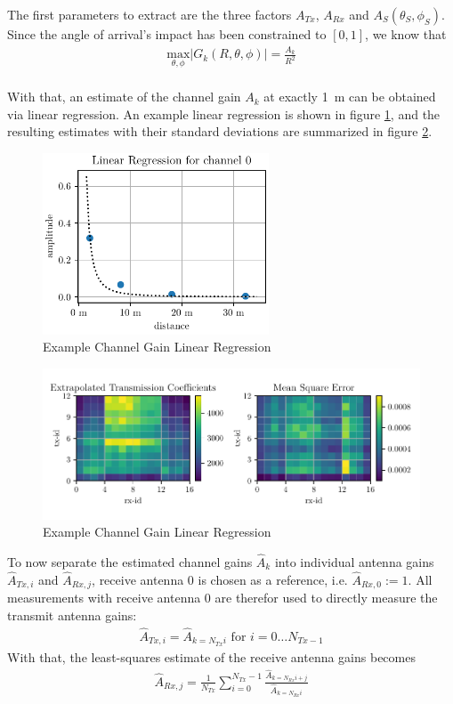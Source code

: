 The first parameters to extract are the three factors $A_{Tx}$, $A_{Rx}$ and $A_S(\theta_S,\phi_S)$.
Since the angle of arrival's impact has been constrained to $[0,1]$, we know that
\begin{align}
    \underset{\theta,\phi}{\text{max}} |G_k(R,\theta,\phi)|  = \frac{A_k}{R^2} \label{eqn:max_G}
\end{align} \\
With that, an estimate of the channel gain $A_k$ at exactly \SI{1}{\meter} can be obtained via linear regression.
An example linear regression is shown in figure \ref{fig:ch0_amp_linreg},
and the resulting estimates with their standard deviations are summarized in figure \ref{fig:amp_linreg}. \\

\begin{figure}
    \centering
    \includegraphics[width=0.6\textwidth]{../figures/ch0_amplitude_linreg.pdf}
    \caption{Example Channel Gain Linear Regression}
    \label{fig:ch0_amp_linreg}
\end{figure}
\begin{figure}
    \centering
    \includegraphics[width=\textwidth]{../figures/amplitude_linreg.pdf}
    \caption{Example Channel Gain Linear Regression}
    \label{fig:amp_linreg}
\end{figure}
To now separate the estimated channel gains $\hat A_k$ into individual antenna gains $\hat A_{Tx,i}$ and $\hat A_{Rx,j}$,
receive antenna 0 is chosen as a reference, i.e. $\hat A_{Rx,0} :=1$.
All measurements with receive antenna 0 are therefor used to directly measure the transmit antenna gains:
\begin{align}
    \hat A_{Tx,i}  = \hat A_{k=N_{Tx}i} \text{ for }i=0 \dots N_{Tx-1}
\end{align}
With that, the least-squares estimate of the receive antenna gains becomes
\begin{align}
    \hat A_{Rx,j} = \frac{1}{N_{Tx}} \sum_{i=0}^{N_{Tx}-1} \frac{\hat A_{k=N_{Rx}i+j}}{\hat A_{k=N_{Rx}i}}
\end{align} \\

